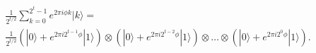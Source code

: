 \begin{equation}
  \label{eqn:QPE}
  \begin{aligned}
    &\frac{1}{2^{t/2}}\sum\limits_{k=0}^{2^t-1}e^{2\pi i\phi k}|k\rangle = \\
    &\frac{1}{2^{t/2}} \left(|0\rangle+e^{2\pi i 2^{t-1}\phi}|1\rangle\right)\otimes\left(|0\rangle+e^{2\pi i 2^{t-2}\phi}|1\rangle\right)\otimes\dots\otimes\left(|0\rangle+e^{2\pi i 2^{0}\phi}|1\rangle\right).
  \end{aligned}
\end{equation}
